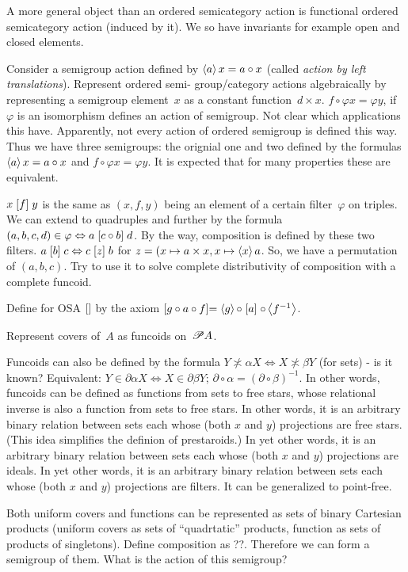 \documentclass{amsart}
\begin{document}
A more general object than an ordered semicategory action is
functional ordered semicategory action (induced by it).
We so have invariants for example open and closed elements.

Consider a semigroup action defined by $\left\langle a\right\rangle x=a\circ x$ (called \emph{action by left translations}).
Represent ordered semi- group/category actions algebraically by representing
a semigroup element~$x$ as a constant function~$d\times x$.
$f\circ\varphi x=\varphi y$, if $\varphi$ is an isomorphism defines
an action of semigroup. Not clear which applications this have.
Apparently, not every action of ordered semigroup is defined this way.
Thus we have three semigroups: the orignial one and two defined by the formulas
$\left\langle a\right\rangle x=a\circ x$ and $f\circ\varphi x=\varphi y$. It is expected that
for many properties these are equivalent.

$x\mathrel{\left[f\right]}y$ is the same as $(x,f,y)$ being an element of a certain filter~$\varphi$
on triples. We can extend to quadruples and further by the formula
$(a,b,c,d)\in\varphi\Leftrightarrow a\mathrel{\left[c\circ b\right]}d$. By the way,
composition is defined by these two filters.
$a\mathrel{\left[b\right]}c\Leftrightarrow c\mathrel{\left[z\right]}b$ for $z=(x\mapsto a\times x,x\mapsto\left\langle x\right\rangle a$. So, we have a permutation of $(a,b,c)$. Try to use it to
solve complete distributivity of composition with a complete funcoid.

Define for OSA $\mathrel{\left[\right]}$ by the axiom $\mathrel{\left[g\circ a\circ f\right]}=\left\langle g\right\rangle\circ\mathrel{\left[a\right]}\circ\left\langle f^{-1}\right\rangle$.

Represent covers of~$A$ as funcoids on~$\mathscr{P} A$.

Funcoids can also be defined by the formula $Y\nasymp\alpha X\Leftrightarrow X\nasymp\beta Y$ (for sets) - is it known?
Equivalent: $Y\in\partial\alpha X\Leftrightarrow X\in\partial\beta Y$; $\partial\circ\alpha=(\partial\circ\beta)^{-1}$.
In other words, funcoids can be defined as functions from sets to free stars, whose relational inverse is also a function from sets to free stars.
In other words, it is an arbitrary binary relation between sets each whose (both $x$ and $y$) projections are free stars.
(This idea simplifies the definion of prestaroids.)
In yet other words, it is an arbitrary binary relation between sets each whose (both $x$ and $y$) projections are ideals.
In yet other words, it is an arbitrary binary relation between sets each whose (both $x$ and $y$) projections are filters.
It can be generalized to point-free.

Both uniform covers and functions can be represented as sets of binary Cartesian products
(uniform covers as sets of ``quadrtatic'' products, function as sets of products of singletons).
Define composition as ??.
Therefore we can form a semigroup of them. What is the action of this semigroup?
\end{document}

